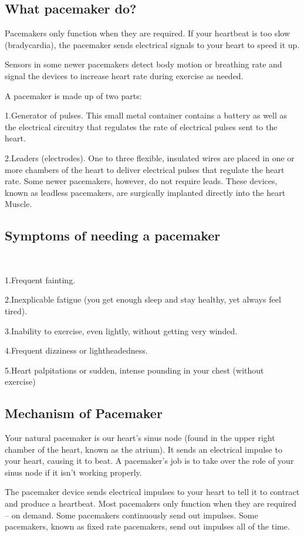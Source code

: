 \documentclass[12pt]{report}
\begin{document}
\subsection{What pacemaker do?}
Pacemakers only function when they are required. If your heartbeat is too slow (bradycardia), the pacemaker sends electrical signals to your heart to speed it up.

Sensors in some newer pacemakers detect body motion or breathing rate and signal the devices to increase heart rate during exercise as needed.

A pacemaker is made up of two parts:

1.Generator of pulses. This small metal container contains a battery as well as the electrical circuitry that regulates the rate of electrical pulses sent to the heart. \

2.Leaders (electrodes). One to three flexible, insulated wires are placed in one or more chambers of the heart to deliver electrical pulses that regulate the heart rate. Some newer pacemakers, however, do not require leads. These devices, known as leadless pacemakers, are surgically implanted directly into the heart Muscle.

\subsection{Symptoms of needing a pacemaker}\

1.Frequent fainting.\

2.Inexplicable fatigue (you get enough sleep and stay healthy, yet always feel tired).\

3.Inability to exercise, even lightly, without getting very winded.\

4.Frequent dizziness or lightheadedness.\

5.Heart palpitations or sudden, intense pounding in your chest (without exercise)\

\subsection{Mechanism of Pacemaker}
Your natural pacemaker is our heart's sinus node (found in the upper right chamber of the heart, known as the atrium). It sends an electrical impulse to your heart, causing it to beat. A pacemaker's job is to take over the role of your sinus node if it isn't working properly.

The pacemaker device sends electrical impulses to your heart to tell it to contract and produce a heartbeat. Most pacemakers only function when they are required – on demand. Some pacemakers continuously send out impulses. Some pacemakers, known as fixed rate pacemakers, send out impulses all of the time.
\end{document}

